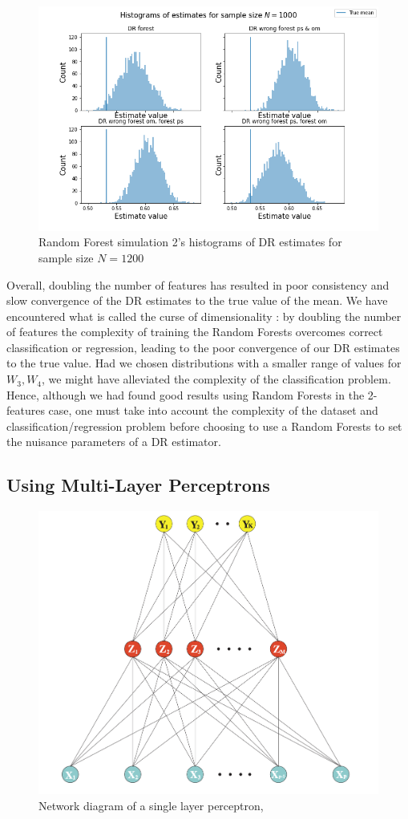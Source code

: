 \documentclass[12pt,twoside]{article}
\begin{document}
\begin{figure}[h!]
    \centering
    \includegraphics[width = 0.9\columnwidth]{figures/histRF_moreW.png}
    \caption{Random Forest simulation 2's histograms of DR estimates for sample size $N = 1200$}
    \label{fighistRF_moreW}
\end{figure}

Overall, doubling the number of features has resulted in poor consistency and slow convergence of the DR estimates to the true value of the mean. We have encountered what is called the curse of dimensionality \citep{Wasserman2006}: by doubling the number of features the complexity of training the Random Forests overcomes correct classification or regression, leading to the poor convergence of our DR estimates to the true value. Had we chosen distributions with a smaller range of values for $W_3,W_4$, we might have alleviated the complexity of the classification problem. Hence, although we had found good results using Random Forests in the 2-features case, one must take into account the complexity of the dataset and classification/regression problem before choosing to use a Random Forests to set the nuisance parameters of a DR estimator.

\clearpage
\subsection{Using Multi-Layer Perceptrons}
\begin{figure}[h!]
    \centering
    \includegraphics[width = 0.7\columnwidth]{figures/Screenshot 2021-05-26 at 19.21.43.png}
    \caption{Network diagram of a single layer perceptron, \citet{hastieESL}}
    \label{fignn}
\end{figure}
\end{document}

